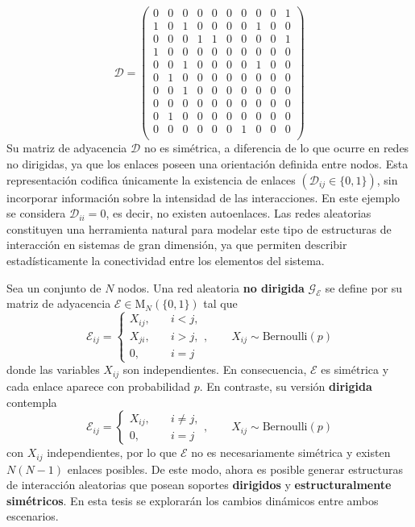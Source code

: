 $$	\mathcal{D} = \begin{pmatrix}
	0 & 0 & 0 & 0 & 0 & 0 & 0 & 0 & 0 & 1 \\
	1 & 0 & 1 & 0 & 0 & 0 & 0 & 1 & 0 & 0 \\
	0 & 0 & 0 & 1 & 1 & 0 & 0 & 0 & 0 & 1 \\
	1 & 0 & 0 & 0 & 0 & 0 & 0 & 0 & 0 & 0 \\
	0 & 0 & 1 & 0 & 0 & 0 & 0 & 1 & 0 & 0 \\
	0 & 1 & 0 & 0 & 0 & 0 & 0 & 0 & 0 & 0 \\
	0 & 0 & 1 & 0 & 0 & 0 & 0 & 0 & 0 & 0 \\
	0 & 0 & 0 & 0 & 0 & 0 & 0 & 0 & 0 & 0 \\
	0 & 1 & 0 & 0 & 0 & 0 & 0 & 0 & 0 & 0 \\
	0 & 0 & 0 & 0 & 0 & 0 & 1 & 0 & 0 & 0 \\
\end{pmatrix}$$
\newline
Su matriz de adyacencia $\mathcal{D}$ no es simétrica, a diferencia de lo que ocurre en redes no dirigidas, ya que los enlaces poseen una orientación definida entre nodos. Esta representación codifica únicamente la existencia de enlaces $(\mathcal{D}_{ij}\in\{0,1\})$, sin incorporar información sobre la intensidad de las interacciones. En este ejemplo se considera $\mathcal{D}_{ii}=0$, es decir, no existen autoenlaces. Las redes aleatorias constituyen una herramienta natural para modelar este tipo de estructuras de interacción en sistemas de gran dimensión, ya que permiten describir estadísticamente la conectividad entre los elementos del sistema.

\begin{definición}\label{def:redAleatoria}
	Sea un conjunto de $N$ nodos. Una red aleatoria \textbf{no dirigida} $\mathcal{G}_\mathcal{E}$ se define por su matriz de adyacencia  $\mathcal{E}\in\mathrm{M}_N(\{0,1\})$ tal que
	$$
	\mathcal{E}_{ij}=\begin{cases}
		X_{ij},\quad &i<j,\\
		X_{ji},\quad &i>j,\\
		0,\quad &i=j
	\end{cases},\qquad X_{ij}\sim \text{Bernoulli}(p)
	$$
	donde las variables $X_{ij}$ son independientes. En consecuencia, $\mathcal{E}$ es simétrica y cada enlace aparece con probabilidad $p$. En contraste, su versión \textbf{dirigida} contempla
	$$
	\mathcal{E}_{ij}=\begin{cases}
		X_{ij},\quad &i\neq j,\\
		0,\quad &i=j
	\end{cases},\qquad X_{ij}\sim\text{Bernoulli}(p)
	$$
	con $X_{ij}$ independientes, por lo que $\mathcal{E}$ no es necesariamente simétrica y existen $N(N-1)$ enlaces posibles. De este modo, ahora es posible generar estructuras de interacción aleatorias que posean soportes \textbf{dirigidos} y \textbf{estructuralmente simétricos}. En esta tesis se explorarán los cambios dinámicos entre ambos escenarios.
\end{definición}











